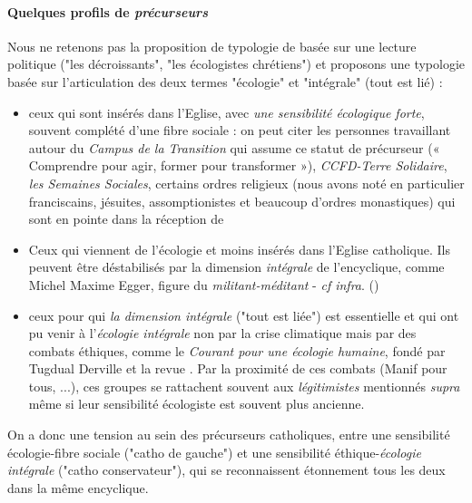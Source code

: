 \paragraph{Quelques profils de \textit{précurseurs}} Nous ne retenons pas la proposition de typologie de \cite{carle_contre-revolutions_2017} basée sur une lecture politique ("les décroissants", "les écologistes chrétiens") et proposons une typologie basée sur l'articulation des deux termes "écologie" et "intégrale" (tout est lié) : 
\begin{itemize}
    \item ceux qui sont insérés dans l'Eglise, avec \textit{une sensibilité écologique forte}, souvent complété d'une fibre sociale : on peut citer les personnes travaillant autour du \textit{Campus de la Transition} qui assume ce statut de précurseur (« Comprendre pour agir, former pour transformer »), \textit{ CCFD-Terre Solidaire}, \textit{les Semaines Sociales},  certains ordres religieux (nous avons noté en particulier franciscains, jésuites, assomptionistes et beaucoup d'ordres monastiques) qui sont en pointe dans la réception de \LS    
    \item Ceux qui viennent de l'écologie et moins insérés dans l'Eglise catholique. Ils peuvent être déstabilisés par la dimension \textit{intégrale} de l'encyclique, comme Michel Maxime Egger, figure du \textit{militant-méditant} - \textit{cf infra}. (\cite{alexandre_grandjean_christophe_monnot_irene_becci_spiritualites_2018})
    \item ceux pour qui \textit{la dimension intégrale} ("tout est liée") est essentielle et qui ont pu venir à l'\textit{écologie intégrale} non par la crise climatique mais par des combats éthiques, comme le  \textit{Courant pour une écologie humaine}, fondé par Tugdual Derville et la revue \RLimite. Par la proximité de ces combats (Manif pour tous, ...), ces groupes se rattachent souvent aux \textit{légitimistes} mentionnés \textit{supra} même si leur sensibilité écologiste est souvent plus ancienne. 
\end{itemize}
 On a donc une tension au sein des précurseurs catholiques, entre une sensibilité écologie-fibre sociale ("catho de gauche") et une sensibilité éthique-\textit{écologie intégrale} ("catho conservateur"), qui se reconnaissent étonnement tous les deux dans la même encyclique.
 
